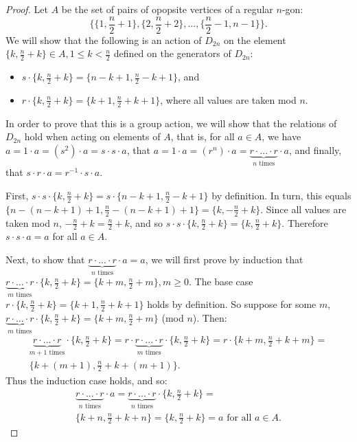 \documentclass{article}
\begin{document}
\begin{proof}
  Let $A$ be the set of pairs of opopsite vertices of a regular $n$-gon:
  \begin{equation*}
    \bigl\{ \{1,\frac{n}{2} + 1\}, \{2, \frac{n}{2} + 2\}, ..., \{\frac{n}{2} - 1, n - 1\} \bigr\}.
  \end{equation*}
  We will show that the following is an action of $D_{2n}$ on the element $\{k, \frac{n}{2} + k\} \in A, 1 \leq k < \frac{n}{2}$ defined on the generators of $D_{2n}$: 
  \begin{itemize}
    \item $s \cdot \{ k, \frac{n}{2} + k \} = \{ n - k + 1, \frac{n}{2} - k + 1 \}$, and
    \item $r \cdot \{ k, \frac{n}{2} + k \} = \{ k + 1, \frac{n}{2} + k + 1 \}$, where all values are taken mod $n$.
  \end{itemize}

  In order to prove that this is a group action, we will show that the relations of $D_{2n}$ hold when acting on elements of $A$, that is, for all $a \in A$, we have $a = 1 \cdot a = (s^2) \cdot a = s \cdot s \cdot a$, that $a = 1 \cdot a = (r^n) \cdot a = \underbrace{r \cdot ... \cdot r}_\text{$n$ times} \cdot a$, and finally, that $s \cdot r \cdot a = r^{-1} \cdot s \cdot a$.

  First, $s \cdot s \cdot \{ k, \frac{n}{2} + k \} = s \cdot \{ n - k + 1, \frac{n}{2} - k + 1 \}$ by definition. In turn, this equals $\{ n - (n - k + 1) + 1, \frac{n}{2} - (n - k + 1) + 1 \} = \{ k, -\frac{n}{2} + k \}$. Since all values are taken mod $n$, $-\frac{n}{2} + k = \frac{n}{2} + k$, and so $s \cdot s \cdot \{ k, \frac{n}{2} + k \} = \{ k, \frac{n}{2} + k \}$. Therefore $s \cdot s \cdot a = a$ for all $a \in A$.

  Next, to show that $\underbrace{r \cdot ... \cdot r}_\text{$n$ times} \cdot a = a$, we will first prove by induction that $\underbrace{r \cdot ... \cdot r}_\text{$m$ times} \cdot \{ k, \frac{n}{2} + k \} = \{ k + m, \frac{n}{2} + m \}, m \geq 0$. The base case $r \cdot \{ k, \frac{n}{2} + k \} = \{ k + 1, \frac{n}{2} + k + 1 \}$ holds by definition. So suppose for some $m$, $\underbrace{r \cdot ... \cdot r}_\text{$m$ times} \cdot \{ k, \frac{n}{2} + k \} = \{ k + m, \frac{n}{2} + m \}$ (mod $n$). Then: 
  \begin{multline*}
    \underbrace{r \cdot ... \cdot r}_\text{$m + 1$ times} \cdot \{ k, \frac{n}{2} + k \} = r \cdot \underbrace{r \cdot ... \cdot r}_\text{$m$ times} \cdot \{ k, \frac{n}{2} + k \} = r \cdot \{ k + m, \frac{n}{2} + k + m \} = \\
    \{ k + (m + 1), \frac{n}{2} + k + (m + 1) \}.
  \end{multline*}
  Thus the induction case holds, and so:
  \begin{multline*}
    \underbrace{r \cdot ... \cdot r}_\text{$n$ times} \cdot a = \underbrace{r \cdot ... \cdot r}_\text{$n$ times} \cdot\{ k, \frac{n}{2} + k \} = \\ \{ k + n, \frac{n}{2} + k + n \} = \{ k, \frac{n}{2} + k \} = a \text{ for all } a \in A.
  \end{multline*}


\end{proof}
\end{document}
